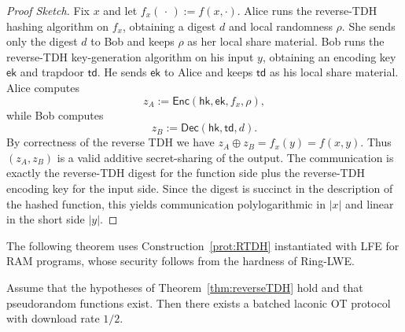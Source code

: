 \documentclass{theoretics}
\newcommand{\algofont}[1]{\ensuremath{\mathsf{#1}}}
\newcommand{\Enc}{{\algofont{Enc}}}
\newcommand{\Dec}{{\algofont{Dec}}}
\begin{document}
{\begin{proof}[Proof Sketch]
    Fix $x$ and let $f_x(\,\cdot\,) := f(x,\cdot)$. Alice runs the reverse-TDH hashing algorithm on $f_x$, obtaining a digest $d$ and local randomness $\rho$.  She sends only the digest $d$ to Bob and keeps $\rho$ as her local share material. Bob runs the reverse-TDH key-generation algorithm on his input $y$, obtaining an encoding key $\mathsf{ek}$ and trapdoor $\mathsf{td}$. He sends $\mathsf{ek}$ to Alice and keeps $\mathsf{td}$ as his local share material.
Alice computes
\[
z_A := \Enc(\mathsf{hk},\mathsf{ek},f_x,\rho),
\]
while Bob computes
\[
z_B := \Dec(\mathsf{hk},\mathsf{td},d).
\]
By correctness of the reverse TDH we have $z_A \oplus z_B = f_x(y) = f(x,y)$.
Thus $(z_A,z_B)$ is a valid additive secret-sharing of the output.
The communication is exactly the reverse-TDH digest for the function side plus
the reverse-TDH encoding key for the input side.  Since the digest is succinct in
the description of the hashed function, this yields communication polylogarithmic in $|x|$ and linear in the short side $|y|$.
\end{proof}}
%
{The following theorem uses  Construction~\ref{prot:RTDH} instantiated with LFE for RAM programs, whose security follows from the hardness of Ring-LWE.}

{\begin{theorem}
Assume that the hypotheses of Theorem~\ref{thm:reverseTDH} hold and that pseudorandom functions exist. Then there exists a batched laconic OT protocol with download rate $1/2$.
\end{theorem}}
\end{document}
